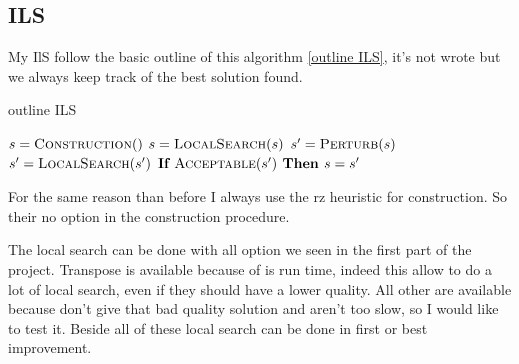 \documentclass[12pt,a4paper]{article}
\begin{document}
\subsection{ILS}

My IlS follow the basic outline of this algorithm \ref{outline ILS}, it's not wrote but we always keep track of the best solution found.

\begin{algorithm}
\caption{outline ILS}
\begin{algorithmic}[1]
\State $s = \Call{Construction}$
\State $s = \Call{LocalSearch}{s}$
	\State $s' = \Call{Perturb}{s}$
	\State $s' = \Call{LocalSearch}{s'}$
	\State $\textbf{If } \Call{Acceptable}{s'} \textbf{ Then } s = s'$
\EndWhile	
\EndProcedure
\end{algorithmic}
\label{outline ILS}
\end{algorithm}

For the same reason than before I always use the rz heuristic for construction. So their no option in the construction procedure.

The local search can be done with all option we seen in the first part of the project. Transpose is available because of is run time, indeed this allow to do a lot of local search, even if they should have a lower quality. All other are available because don't give that bad quality solution and aren't too slow, so I would like to test it. Beside all of these local search can be done in first or best improvement.
\end{document}

